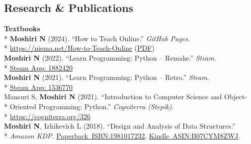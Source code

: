 \documentclass[margin,line]{res}
\begin{document}
\begin{resume}
\section{\sc Research \& Publications}
\textbf{Textbooks}\vspace{2mm}\\*
\hspace*{4mm} \textbf{Moshiri N} (2024). ``How to Teach Online.'' \textit{GitHub Pages}.\\*\vspace{2mm}
\hspace*{8mm} \href{https://niema.net/How-to-Teach-Online}{https://niema.net/How-to-Teach-Online} (\href{https://github.com/niemasd/How-to-Teach-Online/releases/latest/download/How-to-Teach-Online.pdf}{PDF})\\
\hspace*{4mm} \textbf{Moshiri N} (2022). ``Learn Programming: Python -- Remake.'' \textit{Steam}.\\*\vspace{2mm}
\hspace*{8mm} \href{https://store.steampowered.com/app/1882420}{Steam App: 1882420}\\
\hspace*{4mm} \textbf{Moshiri N} (2021). ``Learn Programming: Python -- Retro.'' \textit{Steam}.\\*\vspace{2mm}
\hspace*{8mm} \href{https://store.steampowered.com/app/1536770}{Steam App: 1536770}\\
\hspace*{4mm} Mansuri S, \textbf{Moshiri N} (2021). ``Introduction to Computer Science and Object-\\*
\hspace*{9mm} Oriented Programming: Python.'' \textit{Cogniterra (Stepik)}.\\*\vspace{2mm}
\hspace*{8mm} \href{https://cogniterra.org/326}{https://cogniterra.org/326}\\
\hspace*{4mm} \textbf{Moshiri N}, Izhikevich L (2018). ``Design and Analysis of Data Structures.''\\*\vspace{2mm}
\hspace*{8mm} \textit{Amazon KDP}. \href{https://www.amazon.com/dp/1981017232}{Paperback~ISBN:1981017232}, \href{https://www.amazon.com/dp/B07CYM8ZWJ}{Kindle~ASIN:B07CYM8ZWJ}.\\

\end{resume}
\end{document}
